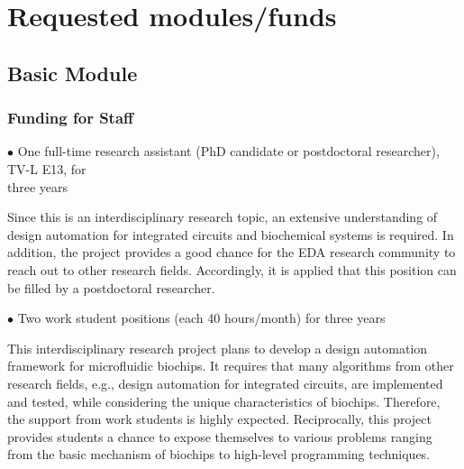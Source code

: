 \section{Requested modules/funds}
\subsection{Basic Module}
\subsubsection{Funding for Staff}
\vskip 8pt
\hskip 10pt $\bullet$\hskip 5pt  One full-time research assistant (PhD
candidate or postdoctoral researcher), TV-L E13, for \\
\phantom{a} \hskip 12pt three years
\vskip 2pt

Since this is an interdisciplinary research topic, an extensive understanding
of design automation for integrated circuits and 
biochemical
systems is required. In addition, the project 
provides a good chance for the EDA research community
to reach out to other research fields.
Accordingly, it is applied that this position 
can be filled by a postdoctoral researcher.

\vskip 8pt
\hskip 10pt $\bullet$\hskip 5pt  
Two work student positions (each 40 hours/month) for three years 
\vskip 2pt

This interdisciplinary research project plans to develop a design
automation framework for microfluidic biochips. It requires that 
many algorithms from other research fields, e.g., design automation for 
integrated circuits, are implemented and tested, while
considering the unique characteristics of biochips. 
Therefore, the support from work
students is highly expected. Reciprocally, this project provides students 
a chance to expose themselves to various problems ranging from
the basic mechanism of biochips to high-level programming techniques.


